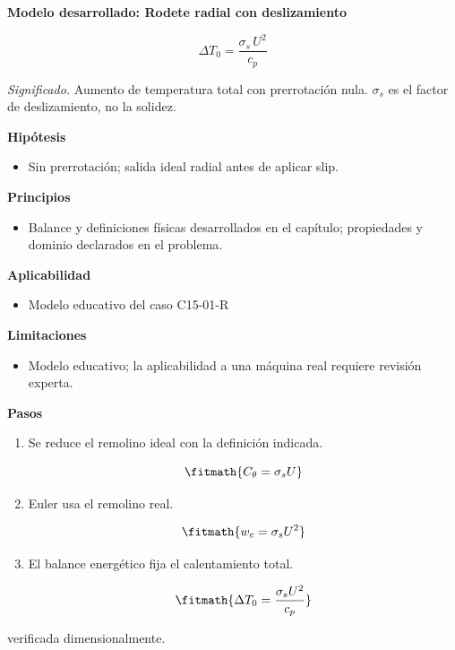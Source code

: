 \documentclass[10pt,openany]{book}
\begin{document}
\begin{tcolorbox}[title={Desarrollos del modelo}, studiumdef, breakable]

\noindent\textbf{Modelo desarrollado: Rodete radial con deslizamiento}

\begin{equation}
\Delta T_0=\frac{\sigma_s\,U^2}{c_p}
\label{eq:EC-C15}
\end{equation}

\noindent\textit{Significado.} Aumento de temperatura total con prerrotación nula. $\sigma_s$ es el factor de deslizamiento, no la solidez.

\noindent\textbf{Hipótesis}
\begin{itemize}
\item Sin prerrotación; salida ideal radial antes de aplicar slip.
\end{itemize}

\noindent\textbf{Principios}
\begin{itemize}
\item Balance y definiciones físicas desarrollados en el capítulo; propiedades y dominio declarados en el problema.
\end{itemize}

\noindent\textbf{Aplicabilidad}
\begin{itemize}
\item Modelo educativo del caso C15-01-R
\end{itemize}

\noindent\textbf{Limitaciones}
\begin{itemize}
\item Modelo educativo; la aplicabilidad a una máquina real requiere revisión experta.
\end{itemize}

\noindent\textbf{Pasos}
\begin{enumerate}
\item
Se reduce el remolino ideal con la definición indicada.

\[
\fitmath{C_\theta=\sigma_s U}
\]
\item
Euler usa el remolino real.

\[
\fitmath{w_c=\sigma_s U^{2}}
\]
\item
El balance energético fija el calentamiento total.

\[
\fitmath{\Delta T_0=\frac{\sigma_s U^{2}}{c_p}}
\]
\end{enumerate}

{\noindent\footnotesize verificada dimensionalmente.\par}
\end{tcolorbox}
\end{document}
